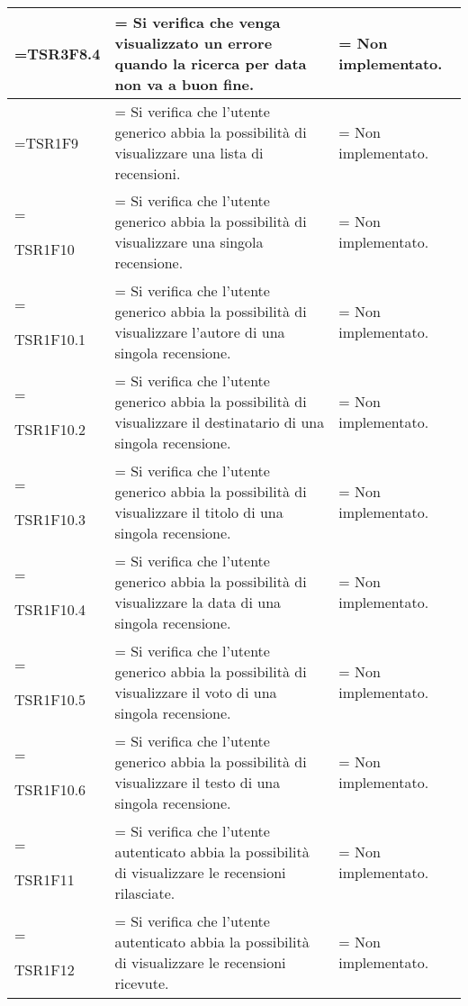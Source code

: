 \begin{xltabular}{\textwidth} {
            >{\hsize\linewidth=\hsize}X
            >{\hsize\linewidth=\hsize}X
            >{\hsize\linewidth=\hsize}X
        }
        TSR3F8.4&
        Si verifica che venga visualizzato un errore quando la ricerca per data non va a buon fine. &
        Non implementato.
        \\ \hline

        TSR1F9 &
        Si verifica che l'utente generico abbia la possibilità di visualizzare una lista di recensioni.  &
        Non implementato.
        \\ \hline

        TSR1F10 &
        Si verifica che l'utente generico abbia la possibilità di visualizzare una singola recensione. &
        Non implementato.
        \\ \hline

        TSR1F10.1 &
        Si verifica che l'utente generico abbia la possibilità di visualizzare l'autore di una singola recensione.  &
        Non implementato.
        \\ \hline

        TSR1F10.2 &
        Si verifica che l'utente generico abbia la possibilità di visualizzare il destinatario di una singola recensione.  &
        Non implementato.
        \\ \hline

        TSR1F10.3 &
        Si verifica che l'utente generico abbia la possibilità di visualizzare il titolo di una singola recensione.  &
        Non implementato.
        \\ \hline

        TSR1F10.4 &
        Si verifica che l'utente generico abbia la possibilità di visualizzare la data di una singola recensione.  &
        Non implementato.
        \\ \hline
        
        TSR1F10.5 &
        Si verifica che l'utente generico abbia la possibilità di visualizzare il voto di una singola recensione.  &
        Non implementato.
        \\ \hline

        TSR1F10.6 &
        Si verifica che l'utente generico abbia la possibilità di visualizzare il testo di una singola recensione.  &
        Non implementato.
        \\ \hline

        TSR1F11 &
        Si verifica che l'utente autenticato abbia la possibilità di visualizzare le recensioni rilasciate.  &
        Non implementato.
        \\ \hline

        TSR1F12 &
        Si verifica che l'utente autenticato abbia la possibilità di visualizzare le recensioni ricevute.  &
        Non implementato.
        \\ \hline


\end{xltabular}
